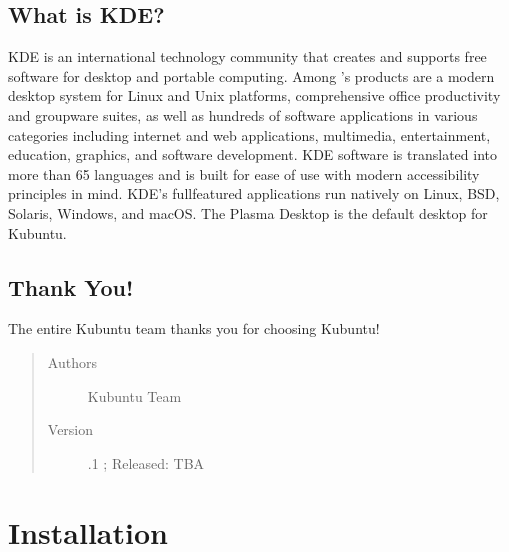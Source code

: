 \documentclass[letterpaper,10pt,english]{sphinxmanual}
\begin{document}
\section{What is KDE?}
\label{\detokenize{welcome:what-is-kde}}
\sphinxAtStartPar
KDE is an international technology community that creates and supports free software for desktop and portable computing. Among ’s products are a modern desktop system for Linux and Unix platforms, comprehensive office productivity and groupware suites, as well as hundreds of software applications in various categories including internet and web applications, multimedia, entertainment, education, graphics, and software development. KDE software is translated into more than 65 languages and is built for ease of use with modern accessibility principles in mind. KDE’s full\sphinxhyphen{}featured applications run natively on Linux, BSD, Solaris, Windows, and macOS. The Plasma Desktop is the default desktop for Kubuntu.


\section{Thank You!}
\label{\detokenize{welcome:thank-you}}
\sphinxAtStartPar
The entire Kubuntu team thanks you for choosing Kubuntu!
\begin{quote}\begin{description}
\item[{Authors}] \leavevmode
\sphinxAtStartPar
Kubuntu Team

\item[{Version}] \leavevmode
{}.1 ; Released: TBA

\end{description}\end{quote}


\chapter{Installation}
\label{\detokenize{docs/installation:installation}}\label{\detokenize{docs/installation::doc}}
\end{document}
